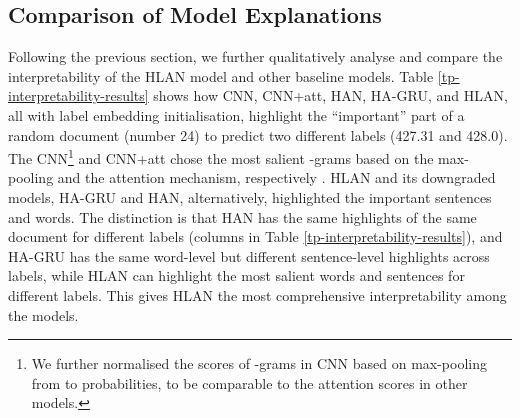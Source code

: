 \documentclass[final,5p,times,twocolumn]{elsarticle}
\begin{document}
\subsection{Comparison of Model Explanations}
Following the previous section, we further qualitatively analyse and compare the interpretability of the HLAN model and other baseline models. Table \ref{tp-interpretability-results} shows how CNN, CNN+att, HAN, HA-GRU, and HLAN, all with label embedding initialisation, highlight the ``important'' part of a random document (number 24) to predict two different labels (427.31 and 428.0). The CNN\footnote{We further normalised the scores of -grams in CNN based on max-pooling from \cite{mullenbach-etal-2018-explainable} to probabilities, to be comparable to the attention scores in other models.} and CNN+att chose the most salient -grams based on the max-pooling and the attention mechanism, respectively \cite{mullenbach-etal-2018-explainable}. HLAN and its downgraded models, HA-GRU and HAN, alternatively, highlighted the important sentences and words. The distinction is that HAN has the same highlights of the same document for different labels (columns in Table \ref{tp-interpretability-results}), and HA-GRU has the same word-level but different sentence-level highlights across labels, while HLAN can highlight the most salient words and sentences for different labels. This gives HLAN the most comprehensive interpretability among the models.
\end{document}
